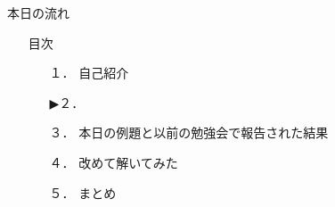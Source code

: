 \begin{frame}{本日の流れ}
  \begin{itemize}
      \item[] 目次
      \begin{itemize}[itemsep=1.3ex, leftmargin=1cm]
        \item[１．]  {\color{cud_lightgray} 自己紹介}
        \item[▶２．] 
        \item[３．] 本日の例題と以前の勉強会で報告された結果
        \item[４．] 改めて解いてみた
        \item[５．] まとめ
     \end{itemize}
  \end{itemize}
\end{frame}
